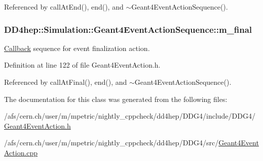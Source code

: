 Referenced by callAtEnd(), end(), and $\sim$Geant4EventActionSequence().\hypertarget{class_d_d4hep_1_1_simulation_1_1_geant4_event_action_sequence_af2e1129997fe4ef05c0bf2e16f29cbca}{
\subsubsection[{m\_\-final}]{ {\bf DD4hep::Simulation::Geant4EventActionSequence::m\_\-final}}}
\label{class_d_d4hep_1_1_simulation_1_1_geant4_event_action_sequence_af2e1129997fe4ef05c0bf2e16f29cbca}


\hyperlink{class_d_d4hep_1_1_callback}{Callback} sequence for event finalization action. 

Definition at line 122 of file Geant4EventAction.h.

Referenced by callAtFinal(), end(), and $\sim$Geant4EventActionSequence().

The documentation for this class was generated from the following files:\begin{DoxyCompactItemize}
\item 
/afs/cern.ch/user/m/mpetric/nightly\_\-cppcheck/dd4hep/DDG4/include/DDG4/\hyperlink{_geant4_event_action_8h}{Geant4EventAction.h}\item 
/afs/cern.ch/user/m/mpetric/nightly\_\-cppcheck/dd4hep/DDG4/src/\hyperlink{_geant4_event_action_8cpp}{Geant4EventAction.cpp}\end{DoxyCompactItemize}
